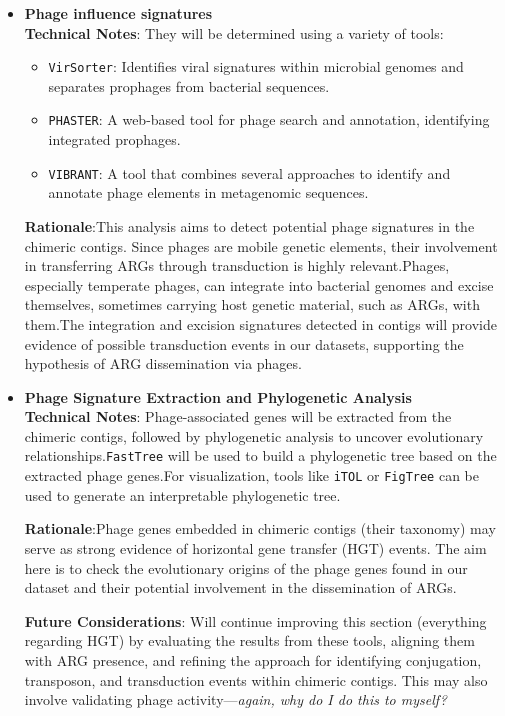 \documentclass[11pt]{article}
\begin{document}
\begin{itemize}
\item \textbf{Phage influence signatures}\\
\textbf{Technical Notes}: They will be determined using a variety of tools:
\begin{itemize}
	\item \texttt{VirSorter}: Identifies viral signatures within microbial genomes and separates prophages from bacterial sequences.
	\item \texttt{PHASTER}: A web-based tool for phage search and annotation, identifying integrated prophages.
	\item \texttt{VIBRANT}: A tool that combines several approaches to identify and annotate phage elements in metagenomic sequences.
\end{itemize}



\textbf{Rationale}:This analysis aims to detect potential phage signatures in the chimeric contigs. Since phages are mobile genetic elements, their involvement in transferring ARGs through transduction is highly relevant.Phages, especially temperate phages, can integrate into bacterial genomes and excise themselves, sometimes carrying host genetic material, such as ARGs, with them.The integration and excision signatures detected in contigs will provide evidence of possible transduction events in our datasets, supporting the hypothesis of ARG dissemination via phages.


\item \textbf{Phage Signature Extraction and Phylogenetic Analysis}\\
\textbf{Technical Notes}: Phage-associated genes will be extracted from the chimeric contigs, followed by phylogenetic analysis to uncover evolutionary relationships.\texttt{FastTree} will be used to build a phylogenetic tree based on the extracted phage genes.For visualization, tools like \texttt{iTOL} or \texttt{FigTree} can be used to generate an interpretable phylogenetic tree.


\textbf{Rationale}:Phage genes embedded in chimeric contigs (their taxonomy) may serve as strong evidence of horizontal gene transfer (HGT) events. The aim here is to check the evolutionary origins of the phage genes found in our dataset and their potential involvement in the dissemination of ARGs.


\textbf{Future Considerations}: 
Will continue improving this section (everything regarding HGT) by evaluating the results from these tools, aligning them with ARG presence, and refining the approach for identifying conjugation, transposon, and transduction events within chimeric contigs. This may also involve validating phage activity—\textit{again, why do I do this to myself?}

\end{itemize}
\end{document}
